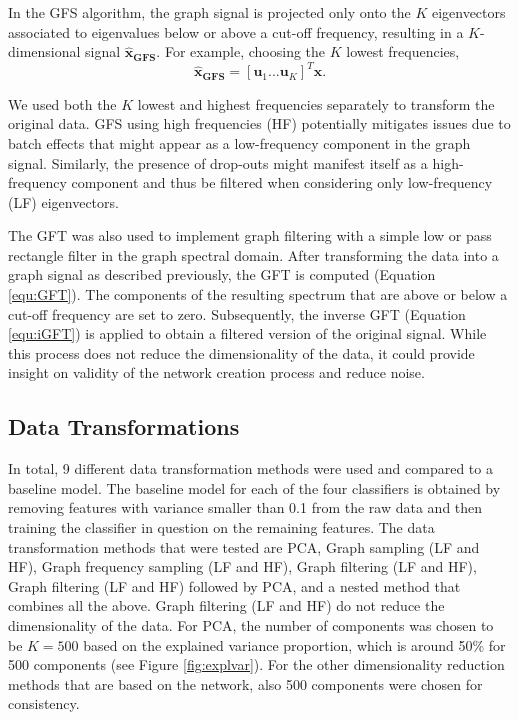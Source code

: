 \documentclass[10pt,conference,compsocconf]{IEEEtran}
\begin{document}
In the GFS algorithm, the graph signal is projected only onto the $K$ eigenvectors associated to eigenvalues below or above a cut-off frequency, resulting in a $K$-dimensional signal $\boldsymbol{\hat{x}_{GFS}}$. For example, choosing the $K$ lowest frequencies,
\begin{equation}
\boldsymbol{\hat{x}_{GFS}} = [ \boldsymbol{u}_1 ... \boldsymbol{u}_K]^T \boldsymbol{x}.
\end{equation} 
\par
We used both the $K$ lowest and highest frequencies separately to transform the original data. GFS using high frequencies (HF) potentially mitigates issues due to batch effects that might appear as a low-frequency component in the graph signal. Similarly, the presence of drop-outs might manifest itself as a high-frequency component and thus be filtered when considering only low-frequency (LF) eigenvectors.
\par
The GFT was also used to implement graph filtering with a simple low or pass rectangle filter in the graph spectral domain. After transforming the data into a graph signal as described previously, the GFT is computed (Equation \ref{equ:GFT}). The components of the resulting spectrum that are above or below a cut-off frequency are set to zero. Subsequently, the inverse GFT (Equation \ref{equ:iGFT}) is applied to obtain a filtered version of the original signal. While this process does not reduce the dimensionality of the data, it could provide insight on validity of the network creation process and reduce noise.

\subsection{Data Transformations}
In total, 9 different data transformation methods were used and compared to a baseline model. The baseline model for each of the four classifiers is obtained by removing features with variance smaller than 0.1 from the raw data and then training the classifier in question on the remaining features. The data transformation methods that were tested are PCA, Graph sampling (LF and HF), Graph frequency sampling (LF and HF), Graph filtering (LF and HF), Graph filtering (LF and HF) followed by PCA, and a nested method that combines all the above. Graph filtering (LF and HF) do not reduce the dimensionality of the data. For PCA, the number of components was chosen to be $K = 500$ based on the explained variance proportion, which is around 50\% for 500 components (see Figure \ref{fig:explvar}). For the other dimensionality reduction methods that are based on the network, also 500 components were chosen for consistency.
\end{document}
